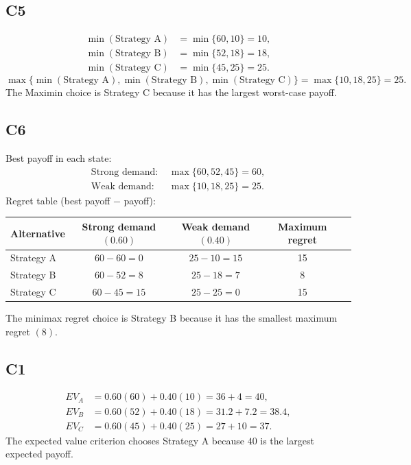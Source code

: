 \begin{ExamProblems}
		\subsection*{C5}
		\[
		\begin{aligned}
		\min(\text{Strategy A}) &= \min\{60,10\} = 10,\\
		\min(\text{Strategy B}) &= \min\{52,18\} = 18,\\
		\min(\text{Strategy C}) &= \min\{45,25\} = 25.
		\end{aligned}
		\]
		\[
		\max\{\min(\text{Strategy A}), \min(\text{Strategy B}), \min(\text{Strategy C})\}
		= \max\{10, 18, 25\}
		= 25.
		\]
		The Maximin choice is Strategy C because it has the largest worst-case payoff.
		
		\subsection*{C6}
		Best payoff in each state:
		\[
		\begin{aligned}
			\text{Strong demand: } &\max\{60, 52, 45\} = 60, \\
			\text{Weak demand: } &\max\{10, 18, 25\} = 25.
		\end{aligned}
		\]
		Regret table (best payoff $-$ payoff):
		\begin{center}
			\begin{tabular}{l c c c c}
				\toprule
				Alternative & Strong demand $(0.60)$ & Weak demand $(0.40)$ & Maximum regret \\
				\midrule
				Strategy A & $60-60=0$ & $25-10=15$ & 15 \\
				Strategy B & $60-52=8$ & $25-18=7$ & 8 \\
				Strategy C & $60-45=15$ & $25-25=0$ & 15 \\
				\bottomrule
			\end{tabular}
		\end{center}
		The minimax regret choice is Strategy B because it has the smallest maximum regret $(8)$.
		
		\subsection*{C1}
		\[
		\begin{aligned}
		EV_A &= 0.60(60)+0.40(10)=36+4=40,\\
		EV_B &= 0.60(52)+0.40(18)=31.2+7.2=38.4,\\
		EV_C &= 0.60(45)+0.40(25)=27+10=37.
		\end{aligned}
		\]
		The expected value criterion chooses Strategy A because $40$ is the largest expected payoff.
		

\end{ExamProblems}
